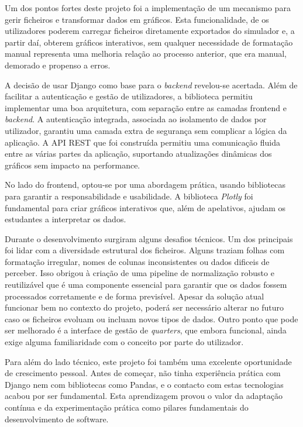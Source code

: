 Um dos pontos fortes deste projeto foi a implementação de um mecanismo  para gerir ficheiros e transformar dados em gráficos. Esta funcionalidade, de os utilizadores poderem carregar ficheiros diretamente exportados do simulador e, a partir daí, obterem gráficos interativos, sem qualquer necessidade de formatação manual representa uma melhoria relação ao processo anterior, que era manual, demorado e propenso a erros. 

A decisão de usar Django como base para o \textit{backend} revelou-se acertada. Além de facilitar a autenticação e gestão de utilizadores, a  biblioteca permitiu implementar uma boa arquitetura, com separação entre as camadas frontend e \textit{backend}. A autenticação integrada, associada ao isolamento de dados por utilizador, garantiu uma camada extra de segurança sem complicar a lógica da aplicação. A API REST que foi construída permitiu uma comunicação fluida entre as várias partes da aplicação, suportando atualizações dinâmicas dos gráficos sem impacto na performance.

No lado do frontend, optou-se por uma abordagem prática, usando bibliotecas para garantir a responsabilidade e usabilidade. A biblioteca \textit{Plotly} foi fundamental para criar gráficos interativos que, além de apelativos, ajudam os estudantes a interpretar os dados.

Durante o desenvolvimento surgiram alguns desafios técnicos. Um dos principais foi lidar com a diversidade estrutural dos ficheiros. Alguns traziam folhas com formatação irregular, nomes de colunas inconsistentes ou dados dificeis de perceber. Isso obrigou à criação de uma pipeline de normalização robusto e reutilizável que é uma componente essencial para garantir que os dados fossem processados corretamente e de forma previsível. Apesar da solução atual funcionar bem no contexto do projeto, poderá ser necessário alterar no futuro caso os ficheiros evoluam ou incluam novos tipos de dados. Outro ponto que pode ser melhorado é a interface de gestão de \textit{quarters}, que embora funcional, ainda exige alguma familiaridade com o conceito por parte do utilizador.

Para além do lado técnico, este projeto foi também uma excelente oportunidade de crescimento pessoal. Antes de começar, não tinha experiência prática com Django nem com bibliotecas como Pandas, e o contacto com estas tecnologias acabou por ser fundamental. Esta aprendizagem provou o valor da adaptação contínua e da experimentação prática como pilares fundamentais do desenvolvimento de software.

